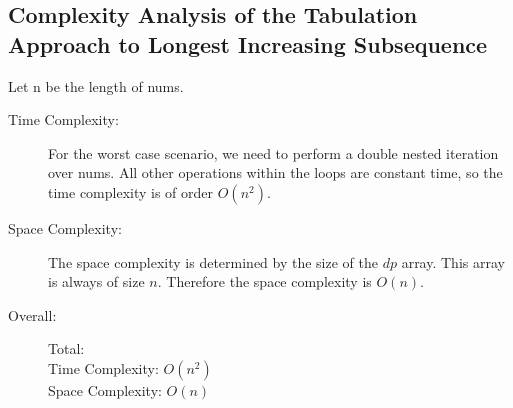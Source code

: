 \subsection{Complexity Analysis of the Tabulation Approach to Longest Increasing Subsequence}
Let n be the length of nums.
\begin{description}
    \item[Time Complexity:]
        For the worst case scenario, we need to perform a double nested iteration over nums.
        All other operations within the loops are constant time, so the time complexity is of order $O(n^2)$.
        
    \item[Space Complexity:] 
        The space complexity is determined by the size of the $dp$ array. This array is always of size $n$.
        Therefore the space complexity is $O(n)$.
        
        
    \item[Overall:] Total:\\
        Time Complexity: $O(n^2)$\\
        Space Complexity: $O(n)$
    
\end{description}
